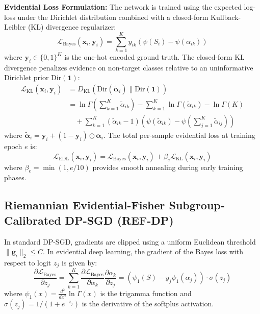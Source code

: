 \documentclass[3p,12pt]{elsarticle}
\theoremstyle{plain}
\theoremstyle{definition}
\begin{document}
\noindent \textbf{Evidential Loss Formulation:} The network is trained using the expected log-loss under the Dirichlet distribution combined with a closed-form Kullback-Leibler (KL) divergence regularizer:
\begin{equation}
    \mathcal{L}_{\text{Bayes}}(\mathbf{x}_i, \mathbf{y}_i) = \sum_{k=1}^K y_{ik} \left( \psi(S_i) - \psi(\alpha_{ik}) \right)
\end{equation}
where $\mathbf{y}_i \in \{0, 1\}^K$ is the one-hot encoded ground truth. The closed-form KL divergence penalizes evidence on non-target classes relative to an uninformative Dirichlet prior $\text{Dir}(\mathbf{1})$:
\begin{align}
    \mathcal{L}_{\text{KL}}(\mathbf{x}_i, \mathbf{y}_i) &= D_{\text{KL}}\left(\text{Dir}(\tilde{\boldsymbol{\alpha}}_i) \parallel \text{Dir}(\mathbf{1})\right) \nonumber \\
    &= \ln \Gamma\left(\sum_{k=1}^K \tilde{\alpha}_{ik}\right) - \sum_{k=1}^K \ln \Gamma(\tilde{\alpha}_{ik}) - \ln \Gamma(K) \nonumber \\
    &\quad + \sum_{k=1}^K (\tilde{\alpha}_{ik} - 1)\left( \psi(\tilde{\alpha}_{ik}) - \psi\left(\sum_{j=1}^K \tilde{\alpha}_{ij}\right) \right)
\end{align}
where $\tilde{\boldsymbol{\alpha}}_i = \mathbf{y}_i + (1 - \mathbf{y}_i) \odot \boldsymbol{\alpha}_i$. The total per-sample evidential loss at training epoch $e$ is:
\begin{equation}
    \mathcal{L}_{\text{EDL}}(\mathbf{x}_i, \mathbf{y}_i) = \mathcal{L}_{\text{Bayes}}(\mathbf{x}_i, \mathbf{y}_i) + \beta_e \mathcal{L}_{\text{KL}}(\mathbf{x}_i, \mathbf{y}_i)
\end{equation}
where $\beta_e = \min(1, e/10)$ provides smooth annealing during early training phases.

\subsection{Riemannian Evidential-Fisher Subgroup-Calibrated DP-SGD (REF-DP)}
\label{sec:sc_dpsgd}

In standard DP-SGD, gradients are clipped using a uniform Euclidean threshold $\|\mathbf{g}_i\|_2 \le C$. In evidential deep learning, the gradient of the Bayes loss with respect to logit $z_j$ is given by:
\begin{equation}
    \frac{\partial \mathcal{L}_{\text{Bayes}}}{\partial z_j} = \sum_{k=1}^K \frac{\partial \mathcal{L}_{\text{Bayes}}}{\partial \alpha_k} \frac{\partial \alpha_k}{\partial z_j} = \left(\psi_1(S) - y_j \psi_1(\alpha_j)\right) \cdot \sigma(z_j)
\end{equation}
where $\psi_1(x) = \frac{d^2}{dx^2} \ln \Gamma(x)$ is the trigamma function and $\sigma(z_j) = 1/(1+e^{-z_j})$ is the derivative of the softplus activation. 
\end{document}
